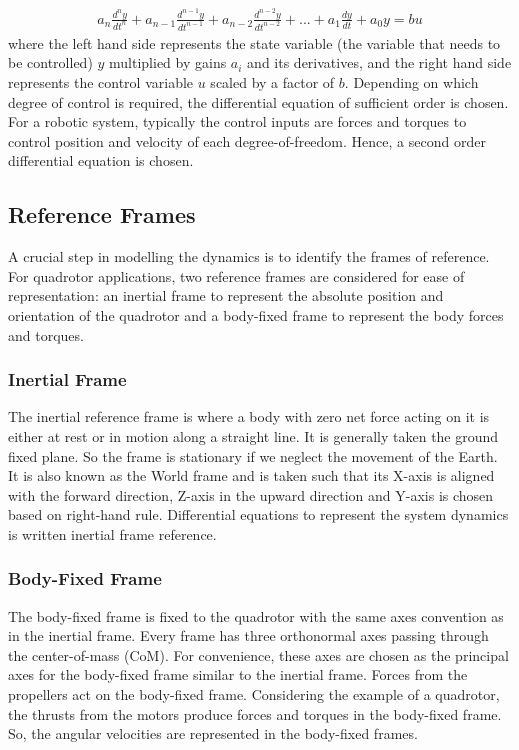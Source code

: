 \begin{align*}
    a_n\frac{d^n y}{dt^n} + a_{n-1}\frac{d^{n-1} y}{dt^{n-1}} + a_{n-2}\frac{d^{n-2} y}{dt^{n-2}} +...+ a_1\frac{dy}{dt} + a_0y = b u
\end{align*}
where the left hand side represents the state variable (the variable that needs to be controlled) $y$ multiplied by gains $a_i$ and its derivatives, and the right hand side represents the control variable $u$ scaled by a factor of $b$. Depending on which degree of control is required, the differential equation of sufficient order is chosen. For a robotic system, typically the control inputs are forces and torques to control position and velocity of each degree-of-freedom. Hence, a second order differential equation is chosen.

\subsection{Reference Frames}
A crucial step in modelling the dynamics is to identify the frames of reference. For quadrotor applications, two reference frames are considered for ease of representation: an inertial frame to represent the absolute position and orientation of the quadrotor and a body-fixed frame to represent the body forces and torques.

\subsubsection{Inertial Frame}
The inertial reference frame is where a body with zero net force acting on it is either at rest or in motion along a straight line. It is generally taken the ground fixed plane. So the frame is stationary if we neglect the movement of the Earth. It is also known as the World frame and is taken such that its X-axis is aligned with the forward direction, Z-axis in the upward direction and Y-axis is chosen based on right-hand rule. Differential equations to represent the system dynamics is written inertial frame reference.

\subsubsection{Body-Fixed Frame}
The body-fixed frame is fixed to the quadrotor with the same axes convention as in the inertial frame.  Every frame has three orthonormal axes passing through the center-of-mass (CoM). For convenience, these axes are chosen as the principal axes for the body-fixed frame similar to the inertial frame. Forces from the propellers act on the body-fixed frame. Considering the example of a quadrotor, the thrusts from the motors produce forces and torques in the body-fixed frame. So, the angular velocities are represented in the body-fixed frames. 

